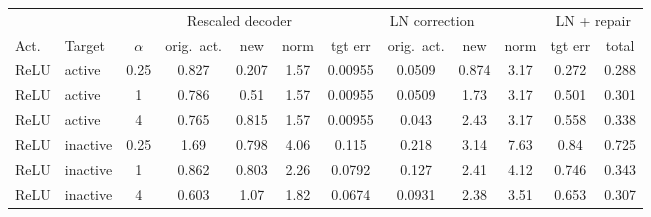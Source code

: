 \begin{tabular}{llc|ccc|cccc|cc}
\toprule
 & & & \multicolumn{3}{c|}{Rescaled decoder} & \multicolumn{4}{c|}{LN correction} & \multicolumn{2}{c}{LN + repair} \\
Act. & Target & $\alpha$ & orig.\ act. & new & norm & tgt err & orig.\ act. & new & norm & tgt err & total \\
\midrule
ReLU & active & 0.25 & 0.827 & 0.207 & 1.57 & 0.00955 & 0.0509 & 0.874 & 3.17 & 0.272 & 0.288 \\
ReLU & active & 1 & 0.786 & 0.51 & 1.57 & 0.00955 & 0.0509 & 1.73 & 3.17 & 0.501 & 0.301 \\
ReLU & active & 4 & 0.765 & 0.815 & 1.57 & 0.00955 & 0.043 & 2.43 & 3.17 & 0.558 & 0.338 \\
ReLU & inactive & 0.25 & 1.69 & 0.798 & 4.06 & 0.115 & 0.218 & 3.14 & 7.63 & 0.84 & 0.725 \\
ReLU & inactive & 1 & 0.862 & 0.803 & 2.26 & 0.0792 & 0.127 & 2.41 & 4.12 & 0.746 & 0.343 \\
ReLU & inactive & 4 & 0.603 & 1.07 & 1.82 & 0.0674 & 0.0931 & 2.38 & 3.51 & 0.653 & 0.307 \\
\bottomrule
\end{tabular}
